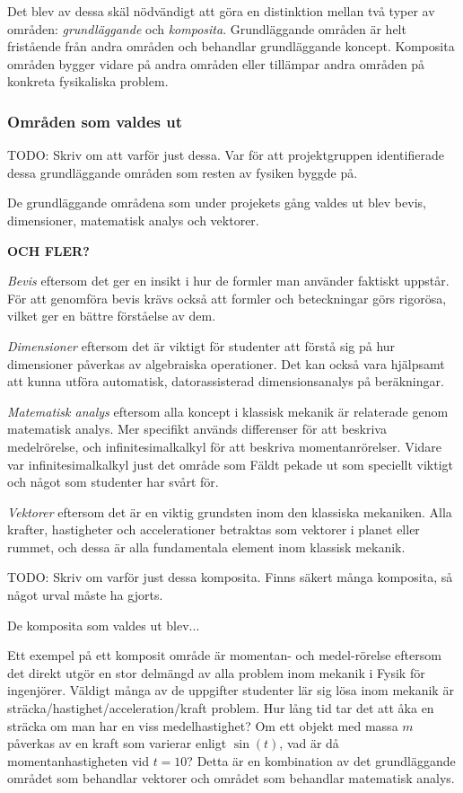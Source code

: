 \begin{draft}
Det blev av dessa skäl nödvändigt att göra en distinktion mellan två typer av områden: \textit{grundläggande} och \textit{komposita}. Grundläggande områden är helt fristående från andra områden och behandlar grundläggande koncept. Komposita områden bygger vidare på andra områden eller tillämpar andra områden på konkreta fysikaliska problem.

\subsubsection{Områden som valdes ut}

TODO: Skriv om att varför just dessa. Var för att projektgruppen identifierade dessa grundläggande områden som resten av fysiken byggde på.

De grundläggande områdena som under projekets gång valdes ut blev bevis, dimensioner, matematisk analys och vektorer.

\textbf{OCH FLER?}

\textit{Bevis} eftersom det ger en insikt i hur de formler man använder
faktiskt uppstår. För att genomföra bevis krävs också att formler och
beteckningar görs rigorösa, vilket ger en bättre förståelse av dem.

\textit{Dimensioner} eftersom det är viktigt för studenter att förstå sig på
hur dimensioner påverkas av algebraiska operationer. Det kan också vara
hjälpsamt att kunna utföra automatisk, datorassisterad dimensionsanalys på
beräkningar.

\textit{Matematisk analys} eftersom alla koncept i klassisk mekanik är
relaterade genom matematisk analys. Mer specifikt används differenser för att
beskriva medelrörelse, och infinitesimalkalkyl för att beskriva
momentanrörelser. Vidare var infinitesimalkalkyl just det område som Fäldt
pekade ut som speciellt viktigt och något som studenter har svårt för.

\textit{Vektorer} eftersom det är en viktig grundsten inom den klassiska
mekaniken. Alla krafter, hastigheter och accelerationer betraktas som vektorer i
planet eller rummet, och dessa är alla fundamentala element inom klassisk
mekanik.

\end{draft}
\begin{binge}

TODO: Skriv om varför just dessa komposita. Finns säkert många komposita, så något urval måste ha gjorts.

De komposita som valdes ut blev...

Ett exempel på ett komposit område är momentan- och medel-rörelse eftersom det
direkt utgör en stor delmängd av alla problem inom mekanik i Fysik för
ingenjörer. Väldigt många av de uppgifter studenter lär sig lösa inom mekanik
är sträcka/hastighet/acceleration/kraft problem. Hur lång tid tar det att åka
en sträcka om man har en viss medelhastighet? Om ett objekt med massa $m$
påverkas av en kraft som varierar enligt $\sin(t)$, vad är då
momentanhastigheten vid $t=10$? Detta är en kombination av det grundläggande
området som behandlar vektorer och området som behandlar matematisk analys.

\end{binge}
